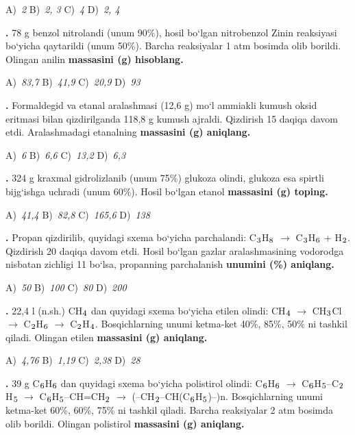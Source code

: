 \documentclass[11pt,a4paper]{article}
\renewcommand{\textsubscript}[1]{\ensuremath{_{\text{\fontsize{8}{8}\selectfont #1}}}}
\newcommand{\qn}[1]{\textbf{\fontsize{11.5}{13}\selectfont #1}}
\newcommand{\qsep}{\par\vspace{13pt}}
\begin{document}
\begin{multicols}{2}
\noindent A)~\textsl{2} \hfill B)~\textsl{2, 3} \hfill C)~\textsl{4} \hfill D)~\textsl{2, 4}\par
\qsep
\noindent\qn{23.} 78 g benzol nitrolandi (unum 90\%), hosil bo`lgan nitrobenzol Zinin reaksiyasi bo`yicha qaytarildi (unum 50\%). Barcha reaksiyalar 1 atm bosimda olib borildi. Olingan anilin \textbf{massasini (g) hisoblang.}

\noindent A)~\textsl{83,7} \hfill B)~\textsl{41,9} \hfill C)~\textsl{20,9} \hfill D)~\textsl{93}\par
\qsep
\noindent\qn{24.} Formaldegid va etanal aralashmasi (12,6 g) mo`l ammiakli kumush oksid eritmasi bilan qizdirilganda 118,8 g kumush ajraldi. Qizdirish 15 daqiqa davom etdi. Aralashmadagi etanalning \textbf{massasini (g) aniqlang.}

\noindent A)~\textsl{6} \hfill B)~\textsl{6,6} \hfill C)~\textsl{13,2} \hfill D)~\textsl{6,3}\par
\qsep
\noindent\qn{25.} 324 g kraxmal gidrolizlanib (unum 75\%) glukoza olindi, glukoza esa spirtli bijg`ishga uchradi (unum 60\%). Hosil bo`lgan etanol \textbf{massasini (g) toping.}

\noindent A)~\textsl{41,4} \hfill B)~\textsl{82,8} \hfill C)~\textsl{165,6} \hfill D)~\textsl{138}\par
\qsep
\noindent\qn{26.} Propan qizdirilib, quyidagi sxema bo`yicha parchalandi: C\textsubscript{3}H\textsubscript{8} $\to$ C\textsubscript{3}H\textsubscript{6} + H\textsubscript{2}. Qizdirish 20 daqiqa davom etdi. Hosil bo`lgan gazlar aralashmasining vodorodga nisbatan zichligi 11 bo`lsa, propanning parchalanish \textbf{unumini (\%) aniqlang.}

\noindent A)~\textsl{50} \hfill B)~\textsl{100} \hfill C)~\textsl{80} \hfill D)~\textsl{200}\par
\qsep
\noindent\qn{27.} 22,4 l (n.sh.) CH\textsubscript{4} dan quyidagi sxema bo`yicha etilen olindi: CH\textsubscript{4} $\to$ CH\textsubscript{3}Cl $\to$ C\textsubscript{2}H\textsubscript{6} $\to$ C\textsubscript{2}H\textsubscript{4}. Bosqichlarning unumi ketma-ket 40\%, 85\%, 50\% ni tashkil qiladi. Olingan etilen \textbf{massasini (g) aniqlang.}

\noindent A)~\textsl{4,76} \hfill B)~\textsl{1,19} \hfill C)~\textsl{2,38} \hfill D)~\textsl{28}\par
\qsep
\noindent\qn{28.} 39 g C\textsubscript{6}H\textsubscript{6} dan quyidagi sxema bo`yicha polistirol olindi: C\textsubscript{6}H\textsubscript{6} $\to$ C\textsubscript{6}H\textsubscript{5}--C\textsubscript{2}H\textsubscript{5} $\to$ C\textsubscript{6}H\textsubscript{5}--CH=CH\textsubscript{2} $\to$ (--CH\textsubscript{2}--CH(C\textsubscript{6}H\textsubscript{5})--)n. Bosqichlarning unumi ketma-ket 60\%, 60\%, 75\% ni tashkil qiladi. Barcha reaksiyalar 2 atm bosimda olib borildi. Olingan polistirol \textbf{massasini (g) aniqlang.}


\end{multicols}
\end{document}
